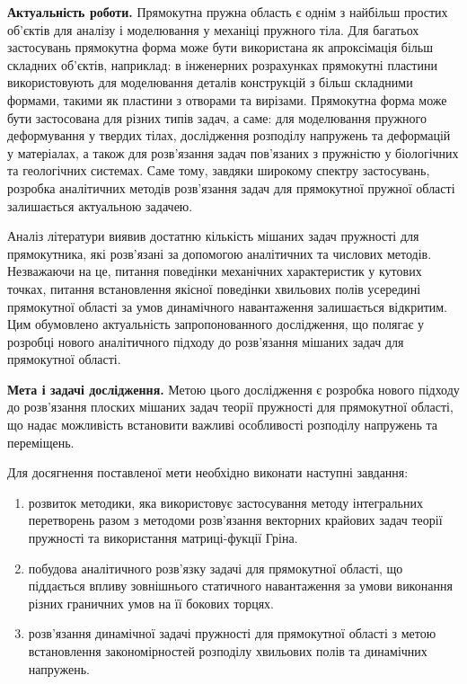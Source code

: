 \textbf{Актуальність роботи.} 
Прямокутна пружна область є однім з найбільш простих об'єктів для аналізу і моделювання у механіці пружного тіла.
Для багатьох застосувань прямокутна форма може бути використана як апроксімація більш складних об'єктів, наприклад:
в інженерних розрахунках прямокутні пластини використовують для моделювання деталів конструкцій з більш складними формами,
такими як пластини з отворами та вирізами. Прямокутна форма може бути застосована для різних типів задач, а саме:
для моделювання пружного деформування у твердих тілах, дослідження розподілу напружень та деформацій у матеріалах,
а також для розв'язання задач пов'язаних з пружністю у біологічних та геологічних системах.
Саме тому, завдяки широкому спектру застосувань, розробка аналітичних методів розв'язання задач для прямокутної пружної області залишається актуальною задачею.



Аналіз літератури виявив достатню кількість мішаних задач пружності для прямокутника, 
які розв'язані за допомогою аналітичних та числових методів.
Незважаючи на це, питання поведінки механічних характеристик у кутових точках,
питання встановлення якісної поведінки хвильових полів усередині прямокутної області за умов динамічного навантаження залишається відкритим.
Цим обумовлено актуальність запропонованного дослідження, що полягає у розробці нового аналітичного підходу до розв'язання мішаних задач для прямокутної області.

\textbf{Мета і задачі дослідження.}
Метою цього дослідження є розробка нового підходу до розв'язання плоских мішаних задач теорії пружності для прямокутної області,
що надає можливість встановити важливі особливості розподілу напружень та переміщень.

Для досягнення поставленої мети необхідно виконати наступні завдання:
\begin{enumerate}
    \item розвиток методики, яка використовує застосування методу інтегральних перетворень разом з методоми розв'язання векторних крайових задач теорії пружності та використання матриці-фукції Гріна. 
    \item побудова аналітичного розв'язку задачі для прямокутної області, що піддається впливу зовнішнього статичного навантаження за умови виконання різних граничних умов на її бокових торцях.
    \item розв'язання динамічної задачі пружності для прямокутної області з метою встановлення закономірностей розподілу хвильових полів та динамічних напружень.
\end{enumerate}

